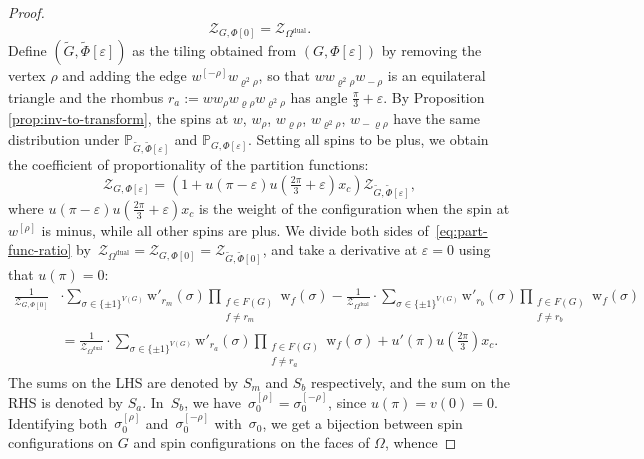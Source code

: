 \documentclass[reqno,11pt,a4paper]{amsart}
\theoremstyle{remark}
\newcommand{\bbP}{\mathbb{P}}
\newcommand{\OmegaDual}{\Omega^{\mathrm{dual}}}
\newcommand{\weOne}{w_{\rho}}
\newcommand{\weTwo}{w_{\varrho\rho}}
\newcommand{\weThree}{w_{\varrho^2\rho}}
\newcommand{\weFour}{w_{\!-\rho}}
\newcommand{\weFive}{w_{\!-\varrho\rho}}
\newcommand{\wrho}{w^{\left[\rho \right]}}
\newcommand{\wmrho}{w^{\left[-\rho \right]}}
\newcommand{\weight}{\mathrm{w}}
\def\cZ{\mathcal Z}
\begin{document}
\begin{proof}
	\begin{equation} \label{eq:0-angle-case}
		\cZ_{G,\Phi[0]} = \cZ_{\OmegaDual}.
	\end{equation}
	Define $(\tilde{G},\tilde{\Phi}[\varepsilon])$ as the tiling obtained from $(G,\Phi[\varepsilon])$ by removing the vertex $\rho$ and adding the edge $\wmrho\weThree$, so that $w \weThree \weFour$ is an equilateral triangle and the rhombus $r_{a}:=w\weOne\weTwo\weThree$ has angle $\tfrac{\pi}{3} + \varepsilon$. By Proposition \ref{prop:inv-to-transform}, the spins  at $w$, $\weOne$, $\weTwo$, $\weThree$, $\weFive$ have the same distribution under $\bbP_{\tilde{G},\tilde{\Phi}[\varepsilon]}$ and $\bbP_{G,\Phi[\varepsilon]}$. Setting all spins to be plus, we obtain the coefficient of proportionality of the partition functions:
	\begin{equation} \label{eq:part-func-ratio}
		\cZ_{G,\Phi[\varepsilon]}  = (1+ u(\pi-\varepsilon)u(\tfrac{2\pi}{3} + \varepsilon)x_{c}) \cZ_{\tilde{G},\tilde{\Phi}[\varepsilon]},
	\end{equation}
	where $ u(\pi-\varepsilon)u(\tfrac{2\pi}{3} + \varepsilon)x_{c}$ is the weight of the configuration when the spin at $\wrho$ is minus, while all other spins are plus. 
	We divide both sides of~\eqref{eq:part-func-ratio} by~$\cZ_{\OmegaDual}=\cZ_{G,\Phi[0]}=\cZ_{\tilde{G},\tilde{\Phi}[0]}$, and take a derivative at $\varepsilon = 0$ using that $u(\pi) = 0$:
	\begin{align} \label{eq:part-func-derivative}
		\frac{1}{\cZ_{G,\Phi[0]}} 
		&\cdot  \sum_{\sigma\in \{\pm 1\}^{V(G)}}\weight'_{r_{m}}(\sigma) \prod_{\substack{f\in F(G)\\ f\neq r_{m}}} \weight_{f}(\sigma)  -   
		\frac{1}{\cZ_{\OmegaDual}} \cdot 
		\sum_{\sigma\in \{\pm 1\}^{V(G)}}\weight'_{r_{b}}(\sigma)\prod_{\substack{f\in F(G)\\ f\neq r_{b}}} \weight_{f}(\sigma) \nonumber \\
		&= \frac{1}{\cZ_{\OmegaDual}} \cdot \sum_{\sigma\in \{\pm 1\}^{V(G)}}\weight'_{r_{a}}(\sigma) \prod_{\substack{f\in F(G)\\ f\neq r_{a}}} \weight_{f}(\sigma) + u'(\pi)u(\tfrac{2\pi}{3})x_{c}.
	\end{align}
	The sums on the LHS are denoted by $S_{m}$ and $S_{b}$ respectively, and the sum on the RHS is denoted by $S_{a}$. 
	In~$S_b$, we have~$\sigma_0^{[\rho]}=\sigma_0^{[-\rho]}$, since $u(\pi) = v(0) = 0$.
	Identifying both~$\sigma_0^{[\rho]}$ and~$\sigma_0^{[-\rho]}$ with~$\sigma_0$, we get a bijection between spin configurations on $G$ and spin configurations on the faces of $\Omega$, whence

\end{proof}
\end{document}

